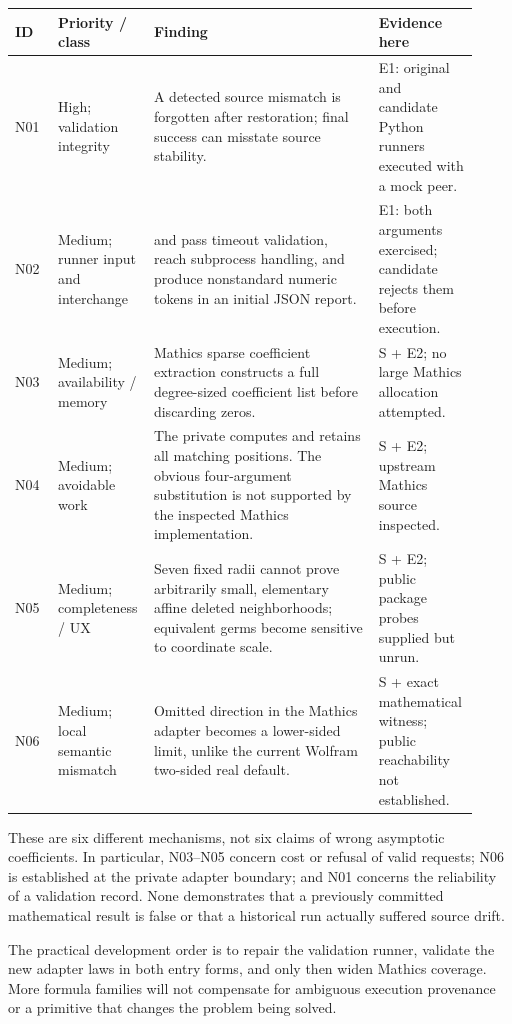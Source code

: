 \documentclass[11pt,a4paper]{article}
\newcommand{\code}[1]{\texttt{\detokenize{#1}}}
\begin{document}
\begin{longtable}{@{}P{0.09\linewidth}P{0.17\linewidth}P{0.47\linewidth}P{0.19\linewidth}@{}}
\toprule
ID & Priority / class & Finding & Evidence here \\
\midrule
\endhead
N01 & High; validation integrity & A detected source mismatch is forgotten after restoration; final success can misstate source stability. & E1: original and candidate Python runners executed with a mock peer. \\
N02 & Medium; runner input and interchange & \code{nan} and \code{inf} pass timeout validation, reach subprocess handling, and produce nonstandard numeric tokens in an initial JSON report. & E1: both arguments exercised; candidate rejects them before execution. \\
N03 & Medium; availability / memory & Mathics sparse coefficient extraction constructs a full degree-sized coefficient list before discarding zeros. & S + E2; no large Mathics allocation attempted. \\
N04 & Medium; avoidable work & The private \code{FirstPosition} computes and retains all matching positions. The obvious four-argument \code{Position} substitution is not supported by the inspected Mathics implementation. & S + E2; upstream Mathics source inspected. \\
N05 & Medium; completeness / UX & Seven fixed radii cannot prove arbitrarily small, elementary affine deleted neighborhoods; equivalent germs become sensitive to coordinate scale. & S + E2; public package probes supplied but unrun. \\
N06 & Medium; local semantic mismatch & Omitted direction in the Mathics \code{Limit} adapter becomes a lower-sided limit, unlike the current Wolfram two-sided real default. & S + exact mathematical witness; public reachability not established. \\
\bottomrule
\end{longtable}

These are six different mechanisms, not six claims of wrong asymptotic
coefficients. In particular, N03--N05 concern cost or refusal of valid requests;
N06 is established at the private adapter boundary; and N01 concerns the
reliability of a validation record. None demonstrates that a previously committed
mathematical result is false or that a historical run actually suffered source
drift.

The practical development order is to repair the validation runner, validate the
new adapter laws in both entry forms, and only then widen Mathics coverage. More
formula families will not compensate for ambiguous execution provenance or a
primitive that changes the problem being solved.
\end{document}
